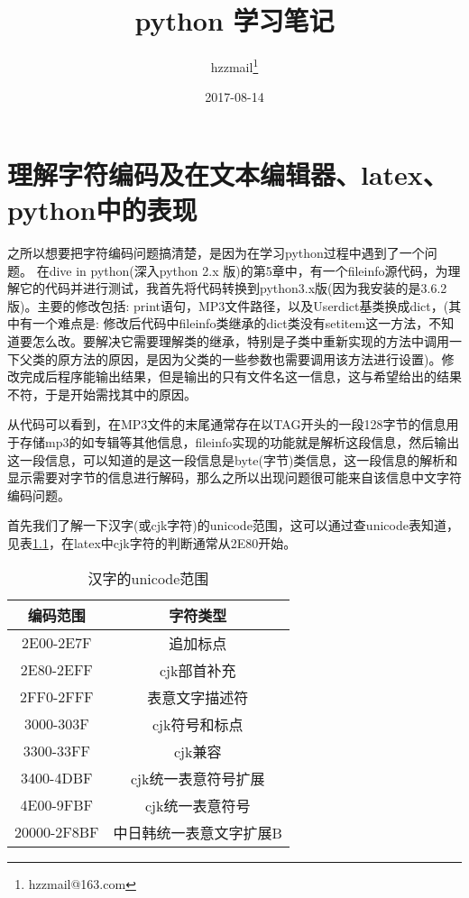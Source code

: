 \documentclass[twoside,11pt]{book}
\begin{document}
\title{python 学习笔记}
\author{hzzmail\thanks{hzzmail@163.com}}
\date{2017-08-14}
\maketitle

\chapter{理解字符编码及在文本编辑器、latex、python中的表现}

之所以想要把字符编码问题搞清楚，是因为在学习python过程中遇到了一个问题。
在dive in python(深入python 2.x 版)的第5章中，有一个fileinfo源代码，为理解它的代码并进行测试，我首先将代码转换到python3.x版(因为我安装的是3.6.2版)。主要的修改包括: print语句，MP3文件路径，以及Userdict基类换成dict，(其中有一个难点是: 修改后代码中fileinfo类继承的dict类没有setitem这一方法，不知道要怎么改。要解决它需要理解类的继承，特别是子类中重新实现的方法中调用一下父类的原方法的原因，是因为父类的一些参数也需要调用该方法进行设置)。修改完成后程序能输出结果，但是输出的只有文件名这一信息，这与希望给出的结果不符，于是开始需找其中的原因。

从代码可以看到，在MP3文件的末尾通常存在以TAG开头的一段128字节的信息用于存储mp3的如专辑等其他信息，fileinfo实现的功能就是解析这段信息，然后输出这一段信息，可以知道的是这一段信息是byte(字节)类信息，这一段信息的解析和显示需要对字节的信息进行解码，那么之所以出现问题很可能来自该信息中文字符编码问题。

首先我们了解一下汉字(或cjk字符)的unicode范围，这可以通过查unicode表知道，见表\ref{tab:unicode:cjk}，在latex中cjk字符的判断通常从2E80开始。

\begin{table}[!htb]
  \centering
  \caption{汉字的unicode范围}\label{tab:unicode:cjk}
  \begin{tabular}{|c|c|}
    \hline
    编码范围 & 字符类型 \\
    \hline
    2E00-2E7F &追加标点 \\
    2E80-2EFF &cjk部首补充 \\
    2FF0-2FFF &表意文字描述符 \\
    3000-303F &cjk符号和标点 \\
    3300-33FF &cjk兼容 \\
    3400-4DBF &cjk统一表意符号扩展 \\
    4E00-9FBF &cjk统一表意符号 \\
    20000-2F8BF &中日韩统一表意文字扩展B \\
    \hline
  \end{tabular}
\end{table}
\end{document}
